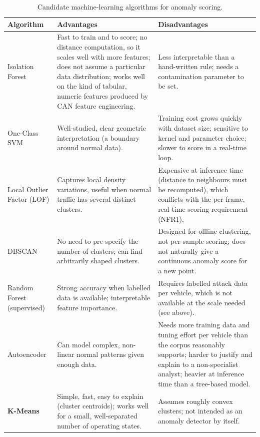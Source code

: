 \begin{table}[H]
\centering
\footnotesize
\caption{Candidate machine-learning algorithms for anomaly scoring.}
\label{tab:ml-comparison}
\begin{tabularx}{\textwidth}{|p{3.1cm}|X|p{2.6cm}|}
\hline
\textbf{Algorithm} & \textbf{Advantages} & \textbf{Disadvantages} \\
\hline
Isolation Forest & Fast to train and to score; no distance computation, so it scales well with more features; does not assume a particular data distribution; works well on the kind of tabular, numeric features produced by CAN feature engineering. & Less interpretable than a hand-written rule; needs a contamination parameter to be set. \\
\hline
One-Class SVM & Well-studied, clear geometric interpretation (a boundary around normal data). & Training cost grows quickly with dataset size; sensitive to kernel and parameter choice; slower to score in a real-time loop. \\
\hline
Local Outlier Factor (LOF) & Captures local density variations, useful when normal traffic has several distinct clusters. & Expensive at inference time (distance to neighbours must be recomputed), which conflicts with the per-frame, real-time scoring requirement (NFR1). \\
\hline
DBSCAN & No need to pre-specify the number of clusters; can find arbitrarily shaped clusters. & Designed for offline clustering, not per-sample scoring; does not naturally give a continuous anomaly score for a new point. \\
\hline
Random Forest (supervised) & Strong accuracy when labelled data is available; interpretable feature importance. & Requires labelled attack data per vehicle, which is not available at the scale needed (see above). \\
\hline
Autoencoder & Can model complex, non-linear normal patterns given enough data. & Needs more training data and tuning effort per vehicle than the corpus reasonably supports; harder to justify and explain to a non-specialist analyst; heavier at inference time than a tree-based model. \\
\hline
\textbf{K-Means} & Simple, fast, easy to explain (cluster centroids); works well for a small, well-separated number of operating states. & Assumes roughly convex clusters; not intended as an anomaly detector by itself. \\
\hline
\end{tabularx}
\normalsize
\end{table}

